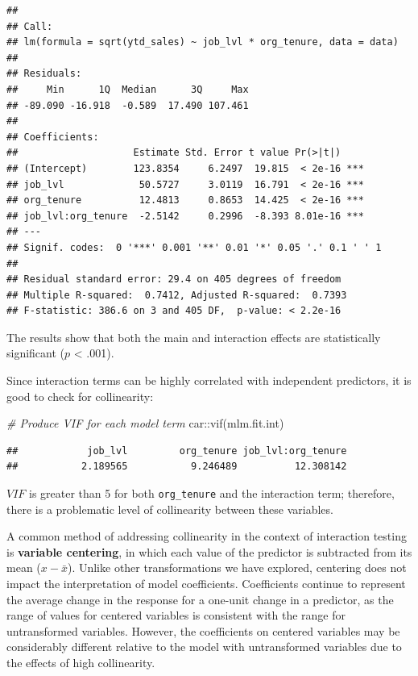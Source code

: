 \documentclass[
]{book}
\newenvironment{Shaded}{\begin{snugshade}}{\end{snugshade}}
\newcommand{\CommentTok}[1]{\textcolor[rgb]{0.56,0.35,0.01}{\textit{#1}}}
\newcommand{\FunctionTok}[1]{\textcolor[rgb]{0.00,0.00,0.00}{#1}}
\newcommand{\NormalTok}[1]{#1}
\newcommand{\SpecialCharTok}[1]{\textcolor[rgb]{0.00,0.00,0.00}{#1}}
\begin{document}
\begin{verbatim}
## 
## Call:
## lm(formula = sqrt(ytd_sales) ~ job_lvl * org_tenure, data = data)
## 
## Residuals:
##     Min      1Q  Median      3Q     Max 
## -89.090 -16.918  -0.589  17.490 107.461 
## 
## Coefficients:
##                    Estimate Std. Error t value Pr(>|t|)    
## (Intercept)        123.8354     6.2497  19.815  < 2e-16 ***
## job_lvl             50.5727     3.0119  16.791  < 2e-16 ***
## org_tenure          12.4813     0.8653  14.425  < 2e-16 ***
## job_lvl:org_tenure  -2.5142     0.2996  -8.393 8.01e-16 ***
## ---
## Signif. codes:  0 '***' 0.001 '**' 0.01 '*' 0.05 '.' 0.1 ' ' 1
## 
## Residual standard error: 29.4 on 405 degrees of freedom
## Multiple R-squared:  0.7412, Adjusted R-squared:  0.7393 
## F-statistic: 386.6 on 3 and 405 DF,  p-value: < 2.2e-16
\end{verbatim}

The results show that both the main and interaction effects are statistically significant (\(p\) \textless{} .001).

Since interaction terms can be highly correlated with independent predictors, it is good to check for collinearity:

\begin{Shaded}
\begin{Highlighting}[]
\CommentTok{\# Produce VIF for each model term}
\NormalTok{car}\SpecialCharTok{::}\FunctionTok{vif}\NormalTok{(mlm.fit.int)}
\end{Highlighting}
\end{Shaded}

\begin{verbatim}
##            job_lvl         org_tenure job_lvl:org_tenure 
##           2.189565           9.246489          12.308142
\end{verbatim}

\(VIF\) is greater than 5 for both \texttt{org\_tenure} and the interaction term; therefore, there is a problematic level of collinearity between these variables.

A common method of addressing collinearity in the context of interaction testing is \textbf{variable centering}, in which each value of the predictor is subtracted from its mean (\(x - \bar{x}\)). Unlike other transformations we have explored, centering does not impact the interpretation of model coefficients. Coefficients continue to represent the average change in the response for a one-unit change in a predictor, as the range of values for centered variables is consistent with the range for untransformed variables. However, the coefficients on centered variables may be considerably different relative to the model with untransformed variables due to the effects of high collinearity.
\end{document}
